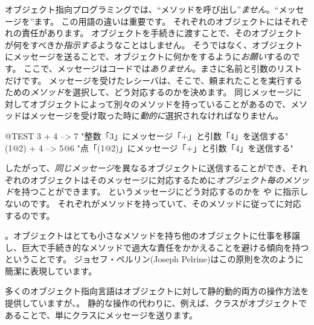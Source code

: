 \documentclass[a4paper,10pt,twoside]{book}
\begin{document}
オブジェクト指向プログラミングでは、``メソッドを呼び出し''\emph{ません}。``メッセージを''ます。
この用語の違いは重要です。
それぞれのオブジェクトにはそれぞれの責任があります。
オブジェクトを手続きに渡すことで、そのオブジェクトが何をすべきか\emph{指示する}ようなことはしません。
そうではなく、オブジェクトにメッセージを送ることで、オブジェクトに何かをするように\emph{お願い}するのです。
ここで、メッセージはコードでは\emph{ありません}。まさに名前と引数のリストだけです。
メッセージを受けたレシーバは、そこで、頼まれたことを実行するための\emph{メソッド}を選択して、どう対応するのかを決めます。
同じメッセージに対してオブジェクトによって別々のメソッドを持っていることがあるので、メソッドはメッセージを受け取った時に\emph{動的に}選択されなければなりません。
\begin{code}{@TEST}
3 + 4         --> 7          "整数「3」にメッセージ「+」と引数「4」を送信する"
(1@2) + 4 --> 5@6    "点「(1@2)」にメッセージ「+」と引数「4」を送信する"
\end{code}
\noindent
したがって、\emph{同じメッセージ}を異なるオブジェクトに送信することができ、それぞれのオブジェクトはそのメッセージに対応するために\emph{オブジェクト毎のメソッド}を持つことができます。
というメッセージにどう対応するのかを や に指示しないのです。
それぞれが\ct{+}メソッドを持っていて、そのメソッドに従ってに対応するのです。

。オブジェクトはとても小さなメソッドを持ち他のオブジェクトに仕事を移譲し、巨大で手続き的なメソッドで過大な責任をかかえることを避ける傾向を持つということです。
ジョセフ・ペルリン(Joseph Pelrine)はこの原則を次のように簡潔に表現しています。

多くのオブジェクト指向言語はオブジェクトに対して静的動的両方の操作方法を提供していますが、。
静的な操作の代わりに、例えば、クラスがオブジェクトであることで、単にクラスにメッセージを送ります。
\end{document}
